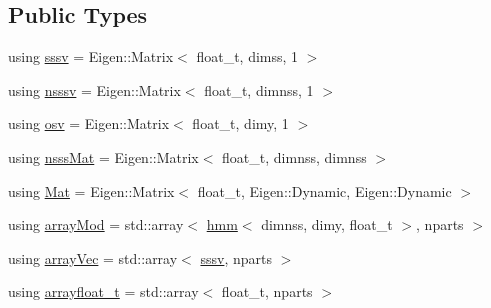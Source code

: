 \subsection*{Public Types}
\begin{DoxyCompactItemize}
\item 
using \hyperlink{classrbpf__hmm_a28e8ad1d93bcf53cb74603f74826a81c}{sssv} = Eigen\+::\+Matrix$<$ float\+\_\+t, dimss, 1 $>$
\item 
using \hyperlink{classrbpf__hmm_a7988465662f94f2ba45fd22566828d0f}{nsssv} = Eigen\+::\+Matrix$<$ float\+\_\+t, dimnss, 1 $>$
\item 
using \hyperlink{classrbpf__hmm_adafd37687fdd3bb776d3d33a5b0e7080}{osv} = Eigen\+::\+Matrix$<$ float\+\_\+t, dimy, 1 $>$
\item 
using \hyperlink{classrbpf__hmm_a7ae942768da71581665168d3c3063c3f}{nsss\+Mat} = Eigen\+::\+Matrix$<$ float\+\_\+t, dimnss, dimnss $>$
\item 
using \hyperlink{classrbpf__hmm_ac32aaf9833767d6886f732243a77aa66}{Mat} = Eigen\+::\+Matrix$<$ float\+\_\+t, Eigen\+::\+Dynamic, Eigen\+::\+Dynamic $>$
\item 
using \hyperlink{classrbpf__hmm_a6dad2eb9cecbc6a85e348fec442c2998}{array\+Mod} = std\+::array$<$ \hyperlink{classhmm}{hmm}$<$ dimnss, dimy, float\+\_\+t $>$, nparts $>$
\item 
using \hyperlink{classrbpf__hmm_a2154906d47b4eb987fe7c238d1aace0a}{array\+Vec} = std\+::array$<$ \hyperlink{classrbpf__hmm_a28e8ad1d93bcf53cb74603f74826a81c}{sssv}, nparts $>$
\item 
using \hyperlink{classrbpf__hmm_aae4e776097278c6e5c25f614d7cad7bd}{arrayfloat\+\_\+t} = std\+::array$<$ float\+\_\+t, nparts $>$
\end{DoxyCompactItemize}
